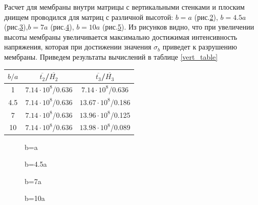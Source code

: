 		\begin{figure}[h!]	
				\def\svgwidth{\columnwidth}
				\caption{} 
				\label{quad_sticking}
		\end{figure}

		
		Расчет для мембраны внутри матрицы с вертикальными стенками и плоским днищем проводился для матриц с различной высотой:
		$b = a$ (рис.\ref{vert_sliging_ba}), $b = 4.5a$ (рис.\ref{vert_sliging_4ba}),$b=7a$ (рис.\ref{vert_sliging_7ba}), $b=10a$ (рис.\ref{vert_sliging_10ba}). Из рисунков видно, что при увеличении высоты мембраны увеличивается максимально достижимая интенсивность напряжения, которая при достижении значения $\sigma_b$ приведет к разрушению мембраны. Приведем результаты вычислений в таблице \ref{vert_table}
\begin{center}

\renewcommand{\arraystretch}{2}
\begin{tabular}{|c|c|c|}
\hline
$b/a$    & $\overline{t_2}$/$\overline{H_2}$ & $\overline{t_3}$/$\overline{H_3}$ \\
\hline\hline
1    & $7.14\cdot10^8$/0.636  & $7.14\cdot10^8$/0.636\\ \hline
4.5  & $7.14\cdot10^8$/0.636  & $13.67\cdot10^8$/0.186\\ \hline
7    & $7.14\cdot10^8$/0.636  & $13.96\cdot10^8$/0.125\\ \hline
10   & $7.14\cdot10^8$/0.636  & $13.98\cdot10^8$/0.089\\ \hline

\end{tabular}
\label{vert_table}
\end{center}
				 
		\begin{figure}[h!]	
				\def\svgwidth{\columnwidth}
				\caption{b=a} 
				\label{vert_sliging_ba}
		\end{figure}

		\begin{figure}[h!]	
				\def\svgwidth{\columnwidth}
				\caption{b=4.5a} 
				\label{vert_sliging_4ba}
		\end{figure}
				\begin{figure}[h!]	
				\def\svgwidth{\columnwidth}
				\caption{b=7a} 
				\label{vert_sliging_7ba}
		\end{figure}
				\begin{figure}[h!]	
				\def\svgwidth{\columnwidth}
				\caption{b=10a} 
				\label{vert_sliging_10ba}
		\end{figure}

